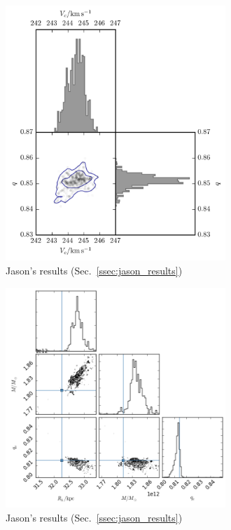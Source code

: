 \begin{figure}
\includegraphics[width=83mm]{./figures/jason_results_logarithmic.png}
  \caption{Jason's results (Sec.~\ref{ssec:jason_results})}
  \label{plot_jason_results_logarithmic}
\end{figure}

\begin{figure}
\includegraphics[width=83mm]{./figures/jason_results_truepot.png}
  \caption{Jason's results (Sec.~\ref{ssec:jason_results})}
  \label{plot_jason_results_truepot}
\end{figure}

